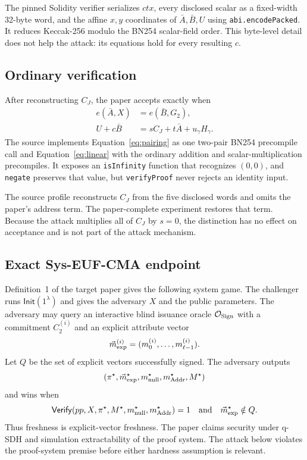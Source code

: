 \documentclass[10pt,a4paper]{article}
\newcommand{\Init}{\mathsf{Init}}
\newcommand{\Verify}{\mathsf{Verify}}
\begin{document}
The pinned Solidity verifier serializes $\mathit{ctx}$, every disclosed
scalar as a fixed-width 32-byte word, and the affine $x,y$ coordinates of
$\bar A,\bar B,U$ using \texttt{abi.encodePacked}. It reduces Keccak-256
modulo the BN254 scalar-field order. This byte-level detail does not help the
attack: its equations hold for every resulting $c$.

\subsection{Ordinary verification}

After reconstructing $C_J$, the paper accepts exactly when
\begin{align}
 e(\bar A,X) &= e(\bar B,G_2),                         \label{eq:pairing}\\
 U+c\bar B   &= sC_J+t\bar A+u_\gamma H_\gamma.       \label{eq:linear}
\end{align}
The source implements Equation~\eqref{eq:pairing} as one two-pair BN254
precompile call and Equation~\eqref{eq:linear} with the ordinary addition and
scalar-multiplication precompiles. It exposes an \texttt{isInfinity}
function that recognizes $(0,0)$, and \texttt{negate} preserves that value,
but \texttt{verifyProof} never rejects an identity input.

The source profile reconstructs $C_J$ from the five disclosed words and omits
the paper's address term. The paper-complete experiment restores that term.
Because the attack multiplies all of $C_J$ by $s=0$, the distinction has no
effect on acceptance and is not part of the attack mechanism.

\subsection{Exact Sys-EUF-CMA endpoint}

Definition~1 of the target paper gives the following system game. The
challenger runs $\Init(1^\lambda)$ and gives the adversary $X$ and the public
parameters. The adversary may query an interactive blind issuance oracle
$\mathcal O_{\rm Sign}$ with a commitment $C_2^{(i)}$ and an explicit
attribute vector
\[
 \vec m_{\rm exp}^{(i)}=(m_0^{(i)},\ldots,m_{\ell-1}^{(i)}).
\]
Let $Q$ be the set of explicit vectors successfully signed. The adversary
outputs
\[
 (\pi^\star,\vec m_{\rm exp}^\star,m_{\rm null}^\star,
  m_{\rm Addr}^\star,M^\star)
\]
and wins when
\begin{equation}
 \Verify(pp,X,\pi^\star,M^\star,m_{\rm null}^\star,
         m_{\rm Addr}^\star)=1
 \quad\text{and}\quad
 \vec m_{\rm exp}^\star\notin Q.                     \label{eq:game}
\end{equation}
Thus freshness is explicit-vector freshness. The paper claims security under
q-SDH and simulation extractability of the proof system. The attack below
violates the proof-system premise before either hardness assumption is
relevant.
\end{document}
